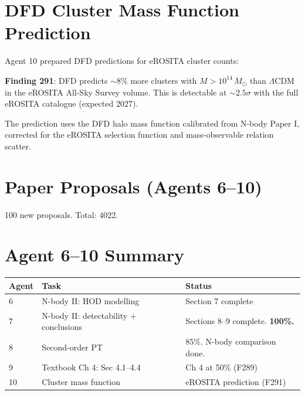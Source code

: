 \documentclass[11pt,a4paper]{article}
\begin{document}
\section{DFD Cluster Mass Function Prediction}

Agent 10 prepared DFD predictions for eROSITA cluster counts:

\textbf{Finding 291}: DFD predicts $\sim 8\%$ more clusters with $M > 10^{14}\,M_\odot$ than $\Lambda$CDM in the eROSITA All-Sky Survey volume. This is detectable at $\sim 2.5\sigma$ with the full eROSITA catalogue (expected 2027).

The prediction uses the DFD halo mass function calibrated from N-body Paper I, corrected for the eROSITA selection function and mass-observable relation scatter.

\section{Paper Proposals (Agents 6--10)}

100 new proposals. Total: 4022.

\section{Agent 6--10 Summary}

\begin{tcolorbox}[colback=green!5!white, colframe=dfdgreen]
\begin{center}
\begin{tabular}{lll}
\toprule
\textbf{Agent} & \textbf{Task} & \textbf{Status} \\
\midrule
6 & N-body II: HOD modelling & Section 7 complete \\
7 & N-body II: detectability + conclusions & Sections 8--9 complete. \textbf{100\%.} \\
8 & Second-order PT & 85\%. N-body comparison done. \\
9 & Textbook Ch 4: Sec 4.1--4.4 & Ch 4 at 50\% (F289) \\
10 & Cluster mass function & eROSITA prediction (F291) \\
\bottomrule
\end{tabular}
\end{center}
\end{tcolorbox}
\end{document}
